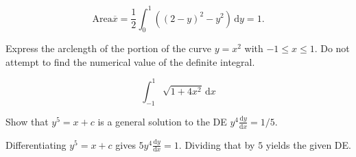 \documentclass[12pt,fleqn,answers]{exam}
\begin{document}
\begin{questions}
\begin{parts}
\begin{solution}[2.5in]
  \begin{equation}
    \mbox{Area} \overline{x} =  \frac{1}{2} \int_0^1 \left( (2-y)^2 - y^2 \right) \, \mathrm{d} y
    = 1.
   \end{equation}
\end{solution}
\end{parts}

\question[5] Express the arclength of the portion of the curve $y = x^2$ 
with $-1 \leq x \leq 1$. Do not
attempt to find the numerical value of the definite integral.
\begin{solution}[2.5in]
\[ \int_{-1}^1 \sqrt{1 + 4 x^2} \, \mathrm{d} x\]
\end{solution}


\newpage
\question [5] Show that $y^5=x+ c$ is a general solution to the DE $y^4  \frac{\mathrm{d} y}{\mathrm{d} x}  = 1/5$.

\begin{solution} Differentiating $y^5=x+ c$ gives 
  $5 y^4 \frac{\mathrm{d} y}{\mathrm{d} x} = 1$. Dividing that by
  $5$ yields the given DE.

\end{solution}
\end{questions}
%     
\end{document}
